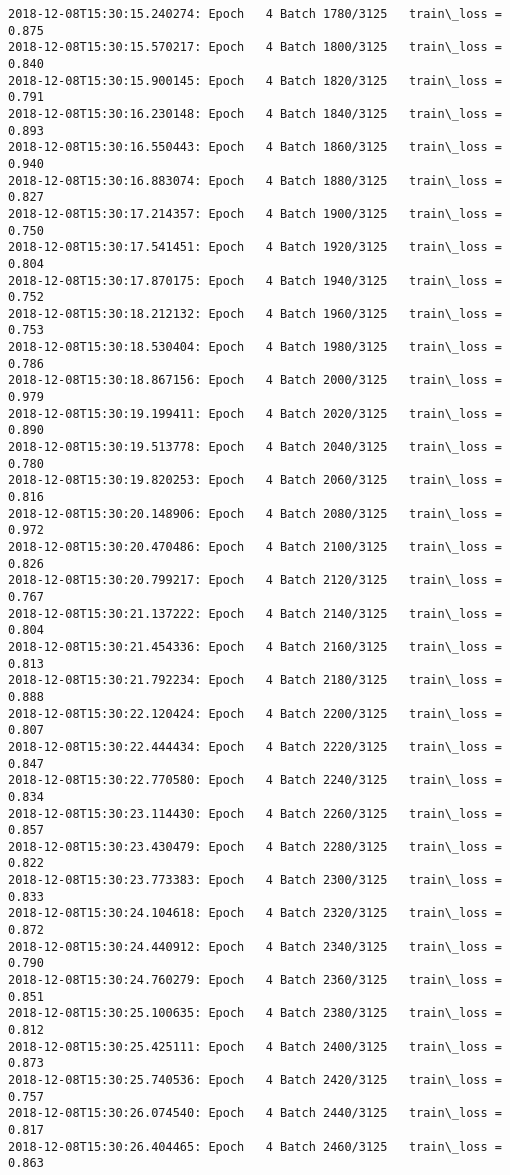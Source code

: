 \documentclass[11pt]{article}
\begin{document}
\begin{Verbatim}[commandchars=\\\{\}]
2018-12-08T15:30:15.240274: Epoch   4 Batch 1780/3125   train\_loss = 0.875
2018-12-08T15:30:15.570217: Epoch   4 Batch 1800/3125   train\_loss = 0.840
2018-12-08T15:30:15.900145: Epoch   4 Batch 1820/3125   train\_loss = 0.791
2018-12-08T15:30:16.230148: Epoch   4 Batch 1840/3125   train\_loss = 0.893
2018-12-08T15:30:16.550443: Epoch   4 Batch 1860/3125   train\_loss = 0.940
2018-12-08T15:30:16.883074: Epoch   4 Batch 1880/3125   train\_loss = 0.827
2018-12-08T15:30:17.214357: Epoch   4 Batch 1900/3125   train\_loss = 0.750
2018-12-08T15:30:17.541451: Epoch   4 Batch 1920/3125   train\_loss = 0.804
2018-12-08T15:30:17.870175: Epoch   4 Batch 1940/3125   train\_loss = 0.752
2018-12-08T15:30:18.212132: Epoch   4 Batch 1960/3125   train\_loss = 0.753
2018-12-08T15:30:18.530404: Epoch   4 Batch 1980/3125   train\_loss = 0.786
2018-12-08T15:30:18.867156: Epoch   4 Batch 2000/3125   train\_loss = 0.979
2018-12-08T15:30:19.199411: Epoch   4 Batch 2020/3125   train\_loss = 0.890
2018-12-08T15:30:19.513778: Epoch   4 Batch 2040/3125   train\_loss = 0.780
2018-12-08T15:30:19.820253: Epoch   4 Batch 2060/3125   train\_loss = 0.816
2018-12-08T15:30:20.148906: Epoch   4 Batch 2080/3125   train\_loss = 0.972
2018-12-08T15:30:20.470486: Epoch   4 Batch 2100/3125   train\_loss = 0.826
2018-12-08T15:30:20.799217: Epoch   4 Batch 2120/3125   train\_loss = 0.767
2018-12-08T15:30:21.137222: Epoch   4 Batch 2140/3125   train\_loss = 0.804
2018-12-08T15:30:21.454336: Epoch   4 Batch 2160/3125   train\_loss = 0.813
2018-12-08T15:30:21.792234: Epoch   4 Batch 2180/3125   train\_loss = 0.888
2018-12-08T15:30:22.120424: Epoch   4 Batch 2200/3125   train\_loss = 0.807
2018-12-08T15:30:22.444434: Epoch   4 Batch 2220/3125   train\_loss = 0.847
2018-12-08T15:30:22.770580: Epoch   4 Batch 2240/3125   train\_loss = 0.834
2018-12-08T15:30:23.114430: Epoch   4 Batch 2260/3125   train\_loss = 0.857
2018-12-08T15:30:23.430479: Epoch   4 Batch 2280/3125   train\_loss = 0.822
2018-12-08T15:30:23.773383: Epoch   4 Batch 2300/3125   train\_loss = 0.833
2018-12-08T15:30:24.104618: Epoch   4 Batch 2320/3125   train\_loss = 0.872
2018-12-08T15:30:24.440912: Epoch   4 Batch 2340/3125   train\_loss = 0.790
2018-12-08T15:30:24.760279: Epoch   4 Batch 2360/3125   train\_loss = 0.851
2018-12-08T15:30:25.100635: Epoch   4 Batch 2380/3125   train\_loss = 0.812
2018-12-08T15:30:25.425111: Epoch   4 Batch 2400/3125   train\_loss = 0.873
2018-12-08T15:30:25.740536: Epoch   4 Batch 2420/3125   train\_loss = 0.757
2018-12-08T15:30:26.074540: Epoch   4 Batch 2440/3125   train\_loss = 0.817
2018-12-08T15:30:26.404465: Epoch   4 Batch 2460/3125   train\_loss = 0.863

\end{Verbatim}
\end{document}
